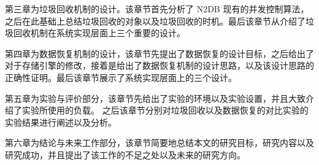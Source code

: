 第三章为垃圾回收机制的设计。该章节首先分析了 N2DB 现有的并发控制算法，之后在此基础上总结垃圾回收的对象以及垃圾回收的时机。最后该章节从介绍了垃圾回收机制在系统实现层面上三个重要的设计。

第四章为数据恢复机制的设计，该章节先提出了数据恢复的设计目标，之后给出了对于存储引擎的修改，接着是给出了数据恢复机制的设计思路，以及该设计思路的正确性证明。最后该章节展示了系统实现层面上的三个设计。

第五章为实验与评价部分，该章节先给出了实验的环境以及实验设置，并且大致介绍了实验所使用的负载。
之后该章节分别对垃圾回收以及数据恢复的对比实验的实验结果进行阐述以及分析。

第六章为结论与未来工作部分，该章节简要地总结本文的研究目标，研究内容以及研究成功，并且提出了该工作的不足之处以及未来的研究方向。


